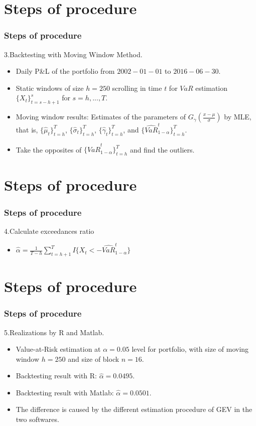 \documentclass[12pt]{beamer}
\begin{document}
\section{Steps of procedure}

\begin{frame}
	\frametitle{Steps of procedure}
        3.Backtesting with Moving Window Method.
	\begin{itemize}
		\item Daily P\&L of the portfolio from $2002-01-01$ to $2016-06-30$.
        \item Static windows of size $h=250$ scrolling in time $t$ for $VaR$ estimation $\{X_t\}_{t=s-h+1}^{s}$ for $s=h,...,T$.
        \item Moving window results: Estimates of the parameters of $G_{\gamma}(\frac{x-\mu}{\sigma})$ by MLE, that is, $\{\hat{\mu}_t\}_{t=h}^T$, $\{\hat{\sigma}_t\}_{t=h}^T$, $\{\hat{\gamma}_t\}_{t=h}^T$, and $\{\widehat{VaR}_{1-\alpha}^t\}_{t=h}^T$.
        \item Take the opposites of $\{\widehat{VaR}_{1-\alpha}^t\}_{t=h}^T$ and find the outliers.
	\end{itemize}
\end{frame}



\section{Steps of procedure}
\begin{frame}
	\frametitle{Steps of procedure}
        4.Calculate exceedances ratio
	\begin{itemize}
        \item $\hat{\alpha}=\frac{1}{T-h}\sum_{t=h+1}^{T}I\{X_t<-\widehat{VaR}_{1-\alpha}^{t}\}$
	\end{itemize}
\end{frame}


\section{Steps of procedure}
\begin{frame}
	\frametitle{Steps of procedure}
        5.Realizations by R and Matlab.
	\begin{itemize}
		\item Value-at-Risk estimation at $\alpha = 0.05$ level for portfolio, with size of moving window $h=250$ and size of block $n = 16$.
        \item Backtesting result with R: $\hat{\alpha}= 0.0495$.
        \item Backtesting result with Matlab: $\hat{\alpha}= 0.0501$.
        \item The difference is caused by the different estimation procedure of GEV in the two softwares.
	\end{itemize}
\end{frame}
\end{document}
